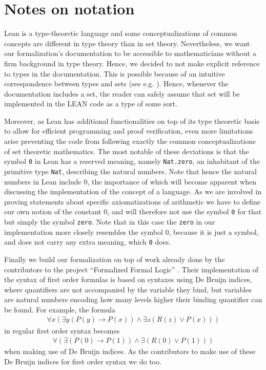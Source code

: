 \chapter{Notes on notation}
Lean is a type-theoretic language and some conceptualizations of common concepts are different in type theory than in set theory. Nevertheless, we want our formalization's documentation to be accessible to mathematicians without a firm background in type theory. Hence, we decided to not make explicit reference to types in the documentation. This is possible because of an intuitive correspondence between types and sets (see e.g. \cite{nederpelt1994}). Hence, whenever the documentation includes a set, the reader can safely assume that set will be implemented in the LEAN code as a type of some sort. 

Moreover, as Lean has additional functionalities on top of its type theoretic basis to allow for efficient programming and proof verification, even more limitations arise preventing the code from following exactly the common conceptualizations of set theoretic mathematics. The most notable of these deviations is that the symbol \lstinline{0} in Lean has a reserved meaning, namely \lstinline{Nat.zero}, an inhabitant of the primitive type \lstinline{Nat}, describing the natural numbers. Note that hence the natural numbers in Lean include 0, the importance of which will become apparent when discussing the implementation of the concept of a language. As we are involved in proving statements about specific axiomatizations of arithmetic we have to define our own notion of the constant 0, and will therefore not use the symbol \lstinline{0} for that but simply the symbol \lstinline{zero}. Note that in this case the \lstinline{zero} in our implementation more closely resembles the symbol 0, because it is just a symbol, and does not carry any extra meaning, which \lstinline{0} does.

Finally we build our formalization on top of work already done by the contributors to the project ``Formalized Formal Logic'' \cite{ffl}. Their implementation of the syntax of first order formulas is based on syntaxes using De Bruijn indices, where quantifiers are not accompanied by the variable they bind, but variables are natural numbers encoding how many levels higher their binding quantifier can be found. For example, the formula 
\begin{align*}
    \forall x (\exists y (P(y) \to P(x)) \land \exists z(R(z) \lor P(x)))
\end{align*}
in regular first order syntax becomes
\begin{align*}
    \forall (\exists (P(0) \to P(1)) \land \exists (R(0) \lor P(1)))
\end{align*}
when making use of De Bruijn indices. As the contributors to \cite{ffl} make use of these De Bruijn indices for first order syntax we do too. 